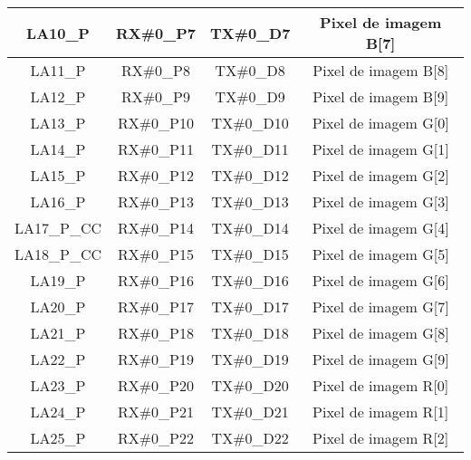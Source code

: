 \begin{table}[h!]
\begin{tabular}{|c|c|c|c|}
		LA10\_P      & RX\#0\_P7                            & TX\#0\_D7                          & Pixel de imagem B{[}7{]} \\ \hline
		LA11\_P      & RX\#0\_P8                            & TX\#0\_D8                          & Pixel de imagem B{[}8{]} \\ \hline
		LA12\_P      & RX\#0\_P9                            & TX\#0\_D9                          & Pixel de imagem B{[}9{]} \\ \hline
		LA13\_P      & RX\#0\_P10                           & TX\#0\_D10                         & Pixel de imagem G{[}0{]} \\ \hline
		LA14\_P      & RX\#0\_P11                           & TX\#0\_D11                         & Pixel de imagem G{[}1{]} \\ \hline
		LA15\_P      & RX\#0\_P12                           & TX\#0\_D12                         & Pixel de imagem G{[}2{]} \\ \hline
		LA16\_P      & RX\#0\_P13                           & TX\#0\_D13                         & Pixel de imagem G{[}3{]} \\ \hline
		LA17\_P\_CC  & RX\#0\_P14                           & TX\#0\_D14                         & Pixel de imagem G{[}4{]} \\ \hline
		LA18\_P\_CC  & RX\#0\_P15                           & TX\#0\_D15                         & Pixel de imagem G{[}5{]} \\ \hline
		LA19\_P      & RX\#0\_P16                           & TX\#0\_D16                         & Pixel de imagem G{[}6{]} \\ \hline
		LA20\_P      & RX\#0\_P17                           & TX\#0\_D17                         & Pixel de imagem G{[}7{]} \\ \hline
		LA21\_P      & RX\#0\_P18                           & TX\#0\_D18                         & Pixel de imagem G{[}8{]} \\ \hline
		LA22\_P      & RX\#0\_P19                           & TX\#0\_D19                         & Pixel de imagem G{[}9{]} \\ \hline
		LA23\_P      & RX\#0\_P20                           & TX\#0\_D20                         & Pixel de imagem R{[}0{]} \\ \hline
		LA24\_P      & RX\#0\_P21                           & TX\#0\_D21                         & Pixel de imagem R{[}1{]} \\ \hline
		LA25\_P      & RX\#0\_P22                           & TX\#0\_D22                         & Pixel de imagem R{[}2{]} \\ \hline

\end{tabular}
\end{table}

